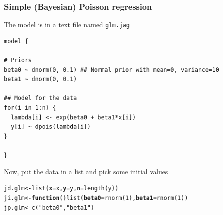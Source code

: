 \documentclass[color=usenames,dvipsnames]{beamer}\usepackage[]{graphicx}\usepackage[]{xcolor}
\makeatletter
\newcommand{\hlnum}[1]{\textcolor[rgb]{0.69,0.494,0}{#1}}%
\newcommand{\hlsng}[1]{\textcolor[rgb]{0.749,0.012,0.012}{#1}}%
\newcommand{\hldef}[1]{\textcolor[rgb]{0,0,0}{#1}}%
\newcommand{\hlkwa}[1]{\textcolor[rgb]{0,0,0}{\textbf{#1}}}%
\newcommand{\hlkwb}[1]{\textcolor[rgb]{0,0.341,0.682}{#1}}%
\newcommand{\hlkwc}[1]{\textcolor[rgb]{0,0,0}{\textbf{#1}}}%
\newcommand{\hlkwd}[1]{\textcolor[rgb]{0.004,0.004,0.506}{#1}}%
\newenvironment{kframe}{%
 \def\at@end@of@kframe{}%
 \ifinner\ifhmode%
  \def\at@end@of@kframe{\end{minipage}}%
  \begin{minipage}{\columnwidth}%
 \fi\fi%
 \def\FrameCommand##1{\hskip\@totalleftmargin \hskip-\fboxsep
 \colorbox{shadecolor}{##1}\hskip-\fboxsep
     \hskip-\linewidth \hskip-\@totalleftmargin \hskip\columnwidth}%
 \MakeFramed {\advance\hsize-\width
   \@totalleftmargin\z@ \linewidth\hsize
   \@setminipage}}%
 {\par\unskip\endMakeFramed%
 \at@end@of@kframe}
\newenvironment{knitrout}{}{} %
\makeatother
\begin{document}
\begin{frame}[fragile]
  \frametitle{Simple (Bayesian) Poisson regression}
  \small
  The model is in a text file named {\tt glm.jag} \\
\begin{knitrout}\scriptsize
{}\color{fgcolor}\begin{kframe}
\begin{verbatim}
model {

# Priors
beta0 ~ dnorm(0, 0.1) ## Normal prior with mean=0, variance=10
beta1 ~ dnorm(0, 0.1)

## Model for the data
for(i in 1:n) {
  lambda[i] <- exp(beta0 + beta1*x[i])
  y[i] ~ dpois(lambda[i])
}

}
\end{verbatim}
\end{kframe}
\end{knitrout}
\pause
\vfill
Now, put the data in a list and pick some initial values
\begin{knitrout}
\color{fgcolor}\begin{kframe}
\begin{alltt}
\hldef{jd.glm} \hlkwb{<-} \hlkwd{list}\hldef{(}\hlkwc{x}\hldef{=x,} \hlkwc{y}\hldef{=y,} \hlkwc{n}\hldef{=}\hlkwd{length}\hldef{(y))}
\hldef{ji.glm} \hlkwb{<-} \hlkwa{function}\hldef{()} \hlkwd{list}\hldef{(}\hlkwc{beta0}\hldef{=}\hlkwd{rnorm}\hldef{(}\hlnum{1}\hldef{),} \hlkwc{beta1}\hldef{=}\hlkwd{rnorm}\hldef{(}\hlnum{1}\hldef{))}
\hldef{jp.glm} \hlkwb{<-} \hlkwd{c}\hldef{(}\hlsng{"beta0"}\hldef{,} \hlsng{"beta1"}\hldef{)}
\end{alltt}
\end{kframe}
\end{knitrout}
\end{frame}
\end{document}
